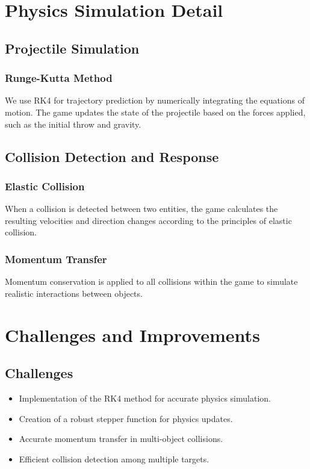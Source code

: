 \documentclass[12pt]{article}
\begin{document}
\section{Physics Simulation Detail}
\subsection{Projectile Simulation}
\subsubsection{Runge-Kutta Method}
We use RK4 for trajectory prediction by numerically integrating the equations of motion. The game updates the state of the projectile based on the forces applied, such as the initial throw and gravity.

\subsection{Collision Detection and Response}
\subsubsection{Elastic Collision}
When a collision is detected between two entities, the game calculates the resulting velocities and direction changes according to the principles of elastic collision.

\subsubsection{Momentum Transfer}
Momentum conservation is applied to all collisions within the game to simulate realistic interactions between objects.

\section{Challenges and Improvements}
\subsection{Challenges}
\begin{itemize}
    \item Implementation of the RK4 method for accurate physics simulation.
    \item Creation of a robust stepper function for physics updates.
    \item Accurate momentum transfer in multi-object collisions.
    \item Efficient collision detection among multiple targets.
\end{itemize}
\end{document}
